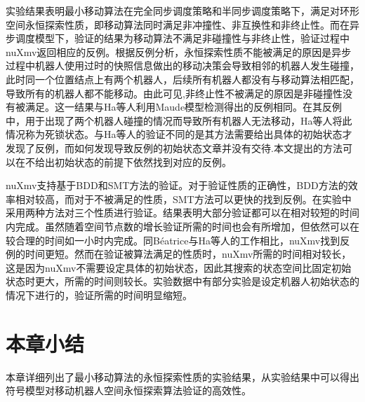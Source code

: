 实验结果表明最小移动算法在完全同步调度策略和半同步调度策略下，满足对环形空间永恒探索性质，即移动算法同时满足非冲撞性、非互换性和非终止性。而在异步调度模型下，验证的结果为移动算法不满足非碰撞性与非终止性，验证过程中nuXmv返回相应的反例。根据反例分析，永恒探索性质不能被满足的原因是异步过程中机器人使用过时的快照信息做出的移动决策会导致相邻的机器人发生碰撞，此时同一个位置结点上有两个机器人，后续所有机器人都没有与移动算法相匹配，导致所有的机器人都不能移动。由此可见,非终止性不被满足的原因是非碰撞性没有被满足。这一结果与Ha等人利用Maude模型检测得出的反例相同。在其反例中，用于出现了两个机器人碰撞的情况而导致所有机器人无法移动，Ha等人将此情况称为死锁状态。与Ha等人的验证不同的是其方法需要给出具体的初始状态才发现了反例，而如何发现导致反例的初始状态文章并没有交待.本文提出的方法可以在不给出初始状态的前提下依然找到对应的反例。

nuXmv支持基于BDD和SMT方法的验证。对于验证性质的正确性，BDD方法的效率相对较高，而对于不被满足的性质，SMT方法可以更快的找到反例。在实验中采用两种方法对三个性质进行验证。结果表明大部分验证都可以在相对较短的时间内完成。虽然随着空间节点数的增长验证所需的时间也会有所增加，但依然可以在较合理的时间如一小时内完成。同Béatrice与Ha等人的工作相比，nuXmv找到反例的时间更短。然而在验证被算法满足的性质时，nuXmv所需的时间相对较长，这是因为nuXmv不需要设定具体的初始状态，因此其搜索的状态空间比固定初始状态时更大，所需的时间则较长。实验数据中有部分实验是设定机器人初始状态的情况下进行的，验证所需的时间明显缩短。

\section{本章小结}
本章详细列出了最小移动算法的永恒探索性质的实验结果，从实验结果中可以得出符号模型对移动机器人空间永恒探索算法验证的高效性。

